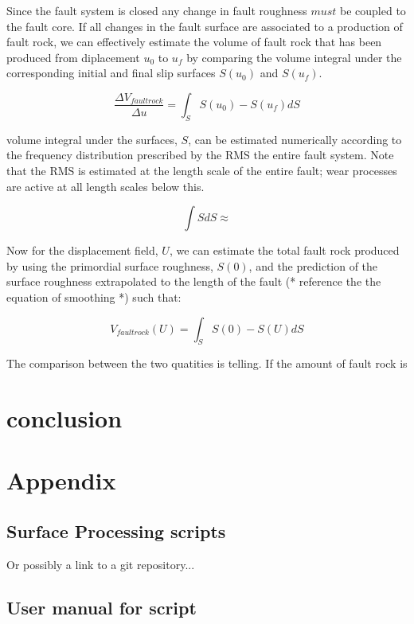 \documentclass[12pt,a4paper]{article}
\begin{document}
Since the fault system is closed any change in fault roughness $must$ be coupled to the fault core. If all changes in the fault surface are associated to a production of fault rock, we can effectively estimate the volume of fault rock that has been produced from diplacement $u_0$ to $u_f$ by comparing the volume integral under the corresponding initial and final slip surfaces $S(u_0)$ and $S(u_f)$.

\begin{equation}
	\dfrac {\Delta V_{fault rock}}{\Delta u} = \int_S S(u_0) - S(u_f) dS
\end{equation}

volume integral under the surfaces, $S$, can be estimated numerically according to the frequency distribution prescribed by the RMS the  entire fault system. Note that the RMS is estimated at the length scale of the entire fault; wear processes are active at all length scales below this.

\begin{equation}
	\int S dS \approx 
\end{equation}

Now for the displacement field, $U$, we can estimate the total fault rock produced by using the primordial surface roughness, $S(0)$, and the prediction of the surface roughness extrapolated to the length of the fault (* reference the the equation of smoothing *) such that:

\begin{equation}
	V_{fault rock}(U) = \int_S S(0)-S(U)dS
\end{equation}

The comparison between the two quatities is telling. If the amount of fault rock is

\section{conclusion}

\section{Appendix}

\subsection{Surface Processing scripts}

Or possibly a link to a git repository...

\subsection{User manual for script}
\end{document}
